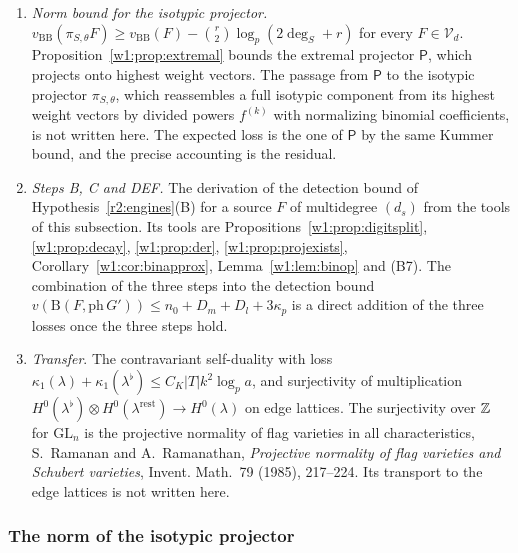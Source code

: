 \begin{enumerate}[label=(B\arabic*),start=7,leftmargin=*]
\item \emph{Norm bound for the isotypic projector.} $v_{\mathrm{BB}}(\pi_{S,\theta}F)\ge v_{\mathrm{BB}}(F)-\binom r2\log_p(2\deg_S+r)$ for every $F\in\mathcal V_d$. Proposition~\ref{w1:prop:extremal} bounds the extremal projector $\mathsf P$, which projects onto highest weight vectors. The passage from $\mathsf P$ to the isotypic projector $\pi_{S,\theta}$, which reassembles a full isotypic component from its highest weight vectors by divided powers $f^{(k)}$ with normalizing binomial coefficients, is not written here. The expected loss is the one of $\mathsf P$ by the same Kummer bound, and the precise accounting is the residual.
\item \emph{Steps B, C and DEF.} The derivation of the detection bound of Hypothesis~\ref{r2:engines}(B) for a source $F$ of multidegree $(d_s)$ from the tools of this subsection. Its tools are Propositions~\ref{w1:prop:digitsplit}, \ref{w1:prop:decay}, \ref{w1:prop:der}, \ref{w1:prop:projexists}, Corollary~\ref{w1:cor:binapprox}, Lemma~\ref{w1:lem:binop} and (B7). The combination of the three steps into the detection bound $v(\mathrm B(F,\mathrm{ph}\,G'))\le n_0+D_m+D_l+3\kappa_p$ is a direct addition of the three losses once the three steps hold.
\item \emph{Transfer}. The contravariant self-duality with loss $\kappa_1(\lambda)+\kappa_1(\lambda^\flat)\le C_K\lvert T\rvert k^2\log_pa$, and surjectivity of multiplication $H^0(\lambda^\flat)\otimes H^0(\lambda^{\mathrm{rest}})\to H^0(\lambda)$ on edge lattices. The surjectivity over $\mathbb Z$ for $\mathrm{GL}_n$ is the projective normality of flag varieties in all characteristics, S.~Ramanan and A.~Ramanathan, \emph{Projective normality of flag varieties and Schubert varieties}, Invent. Math.~79 (1985), 217--224. Its transport to the edge lattices is not written here.
\end{enumerate}


\subsubsection{The norm of the isotypic projector}\label{w1:sec:B7}


